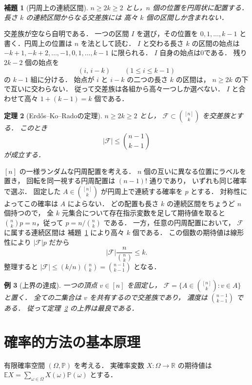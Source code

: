 \documentclass[a5paper,10pt,onecolumn]{jsarticle}
\makeatletter
\theoremstyle{mathnotetheorem}
\newtheorem{theorem}{定理}[section]
\newtheorem{lemma}[theorem]{補題}
\newtheorem{example}[theorem]{例}
\renewcommand{\proofname}{証明}
\renewenvironment{proof}[1][\proofname]{%
  \par\pushQED{\qed}\normalfont\topsep4\p@\@plus2\p@\relax
  \trivlist\item[\hskip\labelsep\bfseries #1]\ignorespaces
}{\popQED\endtrivlist\@endpefalse}
\makeatother
\begin{document}
\begin{lemma}[円周上の連続区間]\label{lem:katona}
$n\ge2k\ge2$ とし，$n$ 個の位置を円周状に配置する．
長さ $k$ の連続区間からなる交差族には
高々 $k$ 個の区間しか含まれない．
\end{lemma}
\begin{proof}
交差族が空なら自明である．
一つの区間 $I$ を選び，その位置を
$0,1,\ldots,k-1$ と書く．円周上の位置は $n$ を法として読む．
$I$ と交わる長さ $k$ の区間の始点は
$-k+1,-k+2,\ldots,-1,0,1,\ldots,k-1$ に限られる．
$I$ 自身の始点は0である．
残り $2k-2$ 個の始点を
\[
 (i,\,i-k)\qquad(1\le i\le k-1)
\]
の $k-1$ 組に分ける．
始点が $i$ と $i-k$ の二つの長さ $k$ の区間は，
$n\ge2k$ の下で互いに交わらない．
従って交差族は各組から高々一つしか選べない．
$I$ と合わせて高々 $1+(k-1)=k$ 個である．
\end{proof}

\begin{theorem}[Erd\H{o}s--Ko--Radoの定理]\label{thm:ekr}
$n\ge2k\ge2$ とし，
$\mathcal F\subset{[n]\choose k}$ を交差族とする．
このとき
\begin{equation}\label{eq:ekr}
 |\mathcal F|\le{n-1\choose k-1}
\end{equation}
が成立する．
\end{theorem}
\begin{proof}
$[n]$ の一様ランダムな円周配置を考える．
$n$ 個の互いに異なる位置にラベルを置き，
回転を同一視する円周配置は $(n-1)!$ 通りであり，
いずれも同じ確率で選ぶ．
固定した $A\in{[n]\choose k}$ が円周上で連続する確率を $p$ とする．
対称性によってこの確率は $A$ によらない．
どの配置も長さ $k$ の連続区間をちょうど $n$ 個持つので，
全 $k$ 元集合について存在指示変数を足して期待値を取ると
${n\choose k}p=n$，従って
$p=n/{n\choose k}$ である．
一方，任意の円周配置において，
$\mathcal F$ に属する連続区間は
補題~\ref{lem:katona} により高々 $k$ 個である．
この個数の期待値は線形性により
$|\mathcal F|p$ だから
\[
 |\mathcal F|\frac n{{n\choose k}}\le k.
\]
整理すると $|\mathcal F|\le(k/n){n\choose k}={n-1\choose k-1}$ となる．
\end{proof}

\begin{example}[上界の達成]
一つの頂点 $v\in[n]$ を固定し，
$\mathcal F=\{A\in{[n]\choose k}:v\in A\}$ と置く．
全ての二集合は $v$ を共有するので交差族であり，
濃度は ${n-1\choose k-1}$ である．
従って定理~\ref{thm:ekr} の上界は最良である．
\end{example}

\section{確率的方法の基本原理}
有限確率空間 $(\Omega,\mathbb P)$ を考える．
実確率変数 $X:\Omega\to\mathbb R$ の期待値は
$\mathbb EX=\sum_{\omega\in\Omega}X(\omega)\mathbb P(\omega)$ とする．
\end{document}
